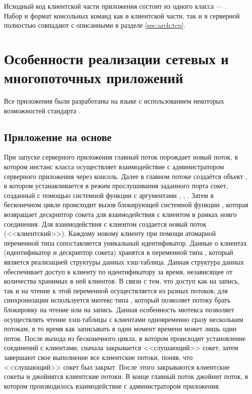Исходный код клиентской части  приложения состоит из одного класса --- .\\[3mm]

Набор и формат консольных команд как в клиентской части, так и в серверной полностью совпадают с описанными в разделе \ref{sec:arch:tcp}.

\section{Особенности реализации сетевых и многопоточных приложений}\label{sec:net}

Все приложения были разработаны на языке  с использованием некоторых возможностей стандарта .

\subsection{Приложение на основе }

При запуске серверного приложения главный поток порождает новый поток, в котором инстанс класса  осуществляет взаимодействие с администратором серверного приложения через консоль. Далее в главном потоке создаётся объект , в котором устанавливается в режим прослушивания заданного порта сокет, созданный с помощью системной функции  с аргументами , , . Затем в бесконечном цикле происходит вызов блокирующей системной функции , которая возвращает дескриптор сокета для взаимодействия с клиентом в рамках новго соединения. Для взаимодействия с клиентом создается новый поток (<<клиентский>>). Каждому новому клиенту при помощи атомарной переменной типа  сопоставляется уникальный идентификатор. Данные о клиентах (идентификатор и дескриптор сокета) хранятся в переменной типа , который является реализацией структуры данных хэш-таблица. Данная структура данных обеспечивает доступ к клиенту по идентификатору за время, независящее от количества хранимых в ней клиентов. В связи с тем, что доступ как на запись, так и на чтение к этой переменной  осуществляется из разных потоков, для синхронизации используется мютекс типа , который позволяет потоку брать блокировку на чтение или на запись. Данная особенность мютекса позволяет осуществлять чтение хэш-таблицы с клиентами одновременно сразу нескольким потокам, в то время как записывать в один момент времени может лишь один поток. После выхода из бесконечного цикла, в котором происходит установление соединений с клиентами, сначала закрывается <<слушающий>> сокет, затем завершают свое выполнение все клиентские потоки, поняв, что <<слушающий>> сокет был закрыт. После этого закрываются клиентские сокеты и джойнятся клиентские потоки. В конце главный поток джойнит поток, в котором производилось взаимодействие с администратором приложения.

